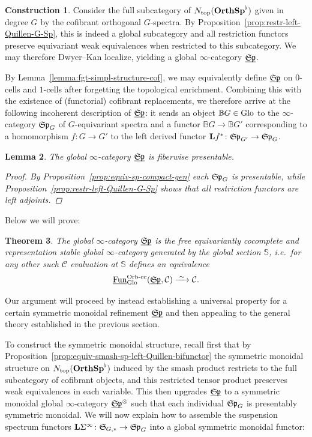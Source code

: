 \documentclass[reqno]{memo-l}
\theoremstyle{mythm}
\newtheorem{thm}{Theorem}[section]
\newtheorem{lemma}[thm]{Lemma}
\theoremstyle{definition}
\newtheorem{constr}[thm]{Construction}
\numberwithin{equation}{section}
\newcommand{\Cc}{{\mathcal{C}}}
\newcommand{\Fun}{{\textup{Fun}}}
\newcommand{\Ntop}{{N_\textup{top}}}
\newcommand{\cat}[1]{\textbf{\textup{#1}}}
\newcommand{\Orb}{{\vphantom{\textup{t}}\smash{\textup{Orb}}}}
\newcommand{\Glo}{\textup{Glo}}
\newcommand{\BGcat}[1]{\mathbb B{#1}}
\newcommand{\ulhelper}[2]{\underline{\setbox0=\hbox{$#1#2$}\dp0=0.4pt \box0\relax}}
\newcommand{\ul}[1]{{\mathpalette\ulhelper{#1}}\hbox{\rule[-2pt]{0pt}{0pt}}}
\newcommand{\iso}{\xrightarrow{\;\smash{\raisebox{-0.25ex}{\ensuremath{\scriptstyle\sim}}}\;}}
\newcommand{\mySp}{{\mathfrak S\kern-.5pt\mathfrak p}}
\newcommand{\myS}{{{\mathfrak S\kern-.4pt}}}
\newcommand{\osp}{{\textbf{\textup{OrthSp}}}}
\begin{document}
\begin{constr}
    Consider the full subcategory of $\Ntop(\osp^\flat)$ given in degree $G$ by the cofibrant orthogonal $G$-spectra. By Proposition~\ref{prop:restr-left-Quillen-G-Sp}, this is indeed a global subcategory and all restriction functors preserve equivariant weak equivalences when restricted to this subcategory. We may therefore Dwyer--Kan localize, yielding a global $\infty$-category $\ul\mySp$.
\end{constr}

By Lemma~\ref{lemma:fgt-simpl-structure-cof}, we may equivalently define $\ul\mySp$ on $0$-cells and $1$-cells after forgetting the topological enrichment. Combining this with the existence of (functorial) cofibrant replacements, we therefore arrive at the following incoherent description of $\ul\mySp$: it sends an object $\BGcat{G}\in\Glo$ to the $\infty$-category $\mySp_G$ of $G$-equivariant spectra and a functor $\BGcat{G}\to\BGcat{G'}$ corresponding to a homomorphism $f\colon G\to G'$ to the left derived functor $\cat{L}f^*\colon\mySp_{G'}\to\mySp_G$.

\begin{lemma}
    The global $\infty$-category $\ul\mySp$ is fiberwise presentable.
    \begin{proof}
        By Proposition~\ref{prop:equiv-sp-compact-gen} each $\mySp_G$ is presentable, while Proposition~\ref{prop:restr-left-Quillen-G-Sp} shows that all restriction functors are left adjoints.
    \end{proof}
\end{lemma}

Below we will prove:

\begin{thm}\label{thm:equiv-main}
    The global $\infty$-category $\ul\mySp$ is the free equivariantly cocomplete and representation stable global $\infty$-category generated by the global section $\mathbb S$, i.e.\ for any other such $\Cc$ evaluation at $\mathbb S$ defines an equivalence
    \[
        \ul\Fun^\textup{$\Orb$-cc}_\Glo(\ul\mySp,\Cc)\iso\Cc.
    \]
\end{thm}

Our argument will proceed by instead establishing a universal property for a certain symmetric monoidal refinement $\ul\mySp$ and then appealing to the general theory established in the previous section. 

To construct the symmetric monoidal structure, recall first that by Proposition~\ref{prop:equiv-smash-sp-left-Quillen-bifunctor} the symmetric monoidal structure on $\Ntop(\osp^\flat)$ induced by the smash product restricts to the full subcategory of cofibrant objects, and this restricted tensor product preserves weak equivalences in each variable. This then upgrades $\ul\mySp$ to a symmetric monoidal global $\infty$-category $\ul\mySp^\otimes$ such that each individual $\mySp_G$ is presentably symmetric monoidal. We will now explain how to assemble the suspension spectrum functors $\cat{L}\Sigma^\infty\colon\myS_{G,*}\to\mySp_G$ into a global symmetric monoidal functor:
\end{document}
